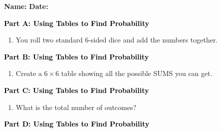 \documentclass[12pt, letterpaper, fleqn]{article}
\newcommand{\blank}{\underline{\hspace{2.2cm}}}
\begin{document}
\textbf{Name:} \underline{\hspace{5cm}}
\hfill
\textbf{Date:} \underline{\hspace{3cm}}\\

\begin{tcolorbox}[colback=customteal!20]
\large\textcolor{black}{\textbf{Part A: Using Tables to Find Probability}}
\end{tcolorbox}

\vspace{3mm}

\begin{enumerate}[itemsep=2.5cm, leftmargin=0.6cm]
\item You roll two standard 6-sided dice and add the numbers together. 
\end{enumerate}

\newpage

\begin{tcolorbox}[colback=customteal!20]
\large\textcolor{black}{\textbf{Part B: Using Tables to Find Probability}}
\end{tcolorbox}

\vspace{3mm}

\begin{enumerate}[itemsep=2.5cm, leftmargin=0.6cm, resume]
\item Create a $6 \times 6$ table showing all the possible SUMS you can get.
\end{enumerate}

\newpage

\begin{tcolorbox}[colback=customteal!20]
\large\textcolor{black}{\textbf{Part C: Using Tables to Find Probability}}
\end{tcolorbox}

\vspace{3mm}

\begin{enumerate}[itemsep=2.5cm, leftmargin=0.6cm, resume]
\item What is the total number of outcomes? \blank
\end{enumerate}

\newpage

\begin{tcolorbox}[colback=customteal!20]
\large\textcolor{black}{\textbf{Part D: Using Tables to Find Probability}}
\end{tcolorbox}
\end{document}
